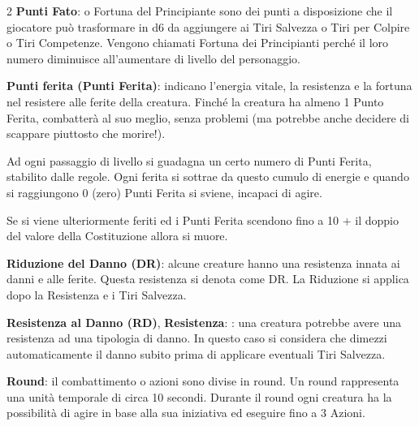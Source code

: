 \begin{multicols}{2}
\textbf{Punti Fato}: o Fortuna del Principiante sono dei punti a disposizione che il giocatore può trasformare in d6 da aggiungere ai Tiri Salvezza o Tiri per Colpire o Tiri Competenze. Vengono chiamati Fortuna dei Principianti perché il loro numero diminuisce all'aumentare di livello del personaggio.

\textbf{Punti ferita (Punti Ferita)}: indicano l'energia vitale, la resistenza e la fortuna nel resistere alle ferite della creatura. Finché la creatura ha almeno 1 Punto Ferita, combatterà al suo meglio, senza problemi (ma potrebbe anche decidere di scappare piuttosto che morire!).

\begin{figure}

	\centering
\end{figure}

Ad ogni passaggio di livello si guadagna un certo numero di Punti Ferita, stabilito dalle regole. Ogni ferita si sottrae da questo cumulo di energie e quando si raggiungono 0 (zero) Punti Ferita si sviene, incapaci di agire.

%

Se si viene ulteriormente feriti ed i Punti Ferita scendono fino a 10 + il doppio del valore della Costituzione allora si muore.

\textbf{Riduzione del Danno (DR)}:   alcune creature hanno una resistenza innata ai danni e alle ferite. Questa resistenza si denota come DR. La Riduzione si applica dopo la Resistenza e i Tiri Salvezza.

\textbf{Resistenza al Danno (RD)}, \textbf{Resistenza}: : una creatura potrebbe avere una resistenza ad una tipologia di danno. In questo caso si considera che dimezzi automaticamente il danno subito prima di applicare eventuali Tiri Salvezza.

\textbf{Round}: il combattimento o azioni sono divise in round. Un round rappresenta una unità temporale di circa 10 secondi. Durante il round ogni creatura ha la possibilità di agire in base alla sua iniziativa ed eseguire fino a 3 Azioni.


\end{multicols}
